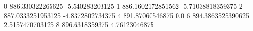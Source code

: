 0 886.330322265625 -5.540283203125
1 886.1602172851562 -5.71038818359375
2 887.0333251953125 -4.8372802734375
4 891.87060546875 0.0
6 894.3863525390625 2.5157470703125
8 896.6318359375 4.76123046875
